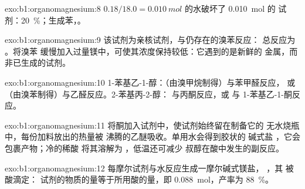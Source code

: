 \begin{solution}{exo:b1:organomagnesium:8}
$0.18/18.0 = \qty{0.010}{mol}$ 的水破坏了 \qty{0.010}{mol} 的
试剂：\qty{20}{\percent}；生成苯，。
\end{solution}

\begin{solution}{exo:b1:organomagnesium:9}
该试剂为亲核试剂，与仍存在的溴苯反应：
总反应为 。将溴苯
缓慢加入过量镁中，可使其浓度保持较低：它遇到的是新鲜的
金属，而非已生成的试剂。
\end{solution}

\begin{solution}{exo:b1:organomagnesium:10}
1-苯基乙-1-醇：（由溴甲烷制得）与苯甲醛反应，
或 （由溴苯制得）与乙醛反应。2-苯基丙-2-醇：
 与丙酮反应，或  与
1-苯基乙-1-酮反应。
\end{solution}

\begin{solution}{exo:b1:organomagnesium:11}
将酮加入试剂中，使试剂始终留在制备它的
无水烧瓶中，每份加料放出的热量被
沸腾的乙醚吸收。单用水会得到胶状的
碱式盐 ，它会包裹产物；冷的稀酸
将其溶解为 ，低温还可减少
叔醇在酸中发生的副反应。
\end{solution}

\begin{solution}{exo:b1:organomagnesium:12}
每摩尔试剂与水反应生成一摩尔碱式镁盐，
，其  被酸滴定：
试剂的物质的量等于所用酸的量，即 \qty{0.088}{mol}，产率为
\qty{88}{\percent}。
\end{solution}

